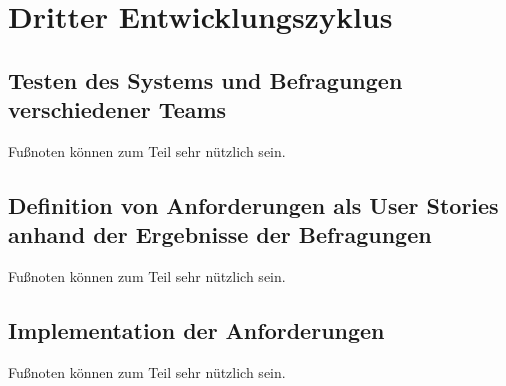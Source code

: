 \chapter{Dritter Entwicklungszyklus}
\label{cha:dritter_entwicklungszyklus}

\section{Testen des Systems und Befragungen verschiedener Teams} 
\label{sec:dritter_testen_befragen}
Fußnoten können zum Teil sehr nützlich sein. 

\section{Definition von Anforderungen als User Stories anhand der Ergebnisse der Befragungen} 
\label{sec:dritter_anforderungen_user_stories}
Fußnoten können zum Teil sehr nützlich sein. 

\section{Implementation der Anforderungen} 
\label{sec:dritter_implementation}
Fußnoten können zum Teil sehr nützlich sein. 
